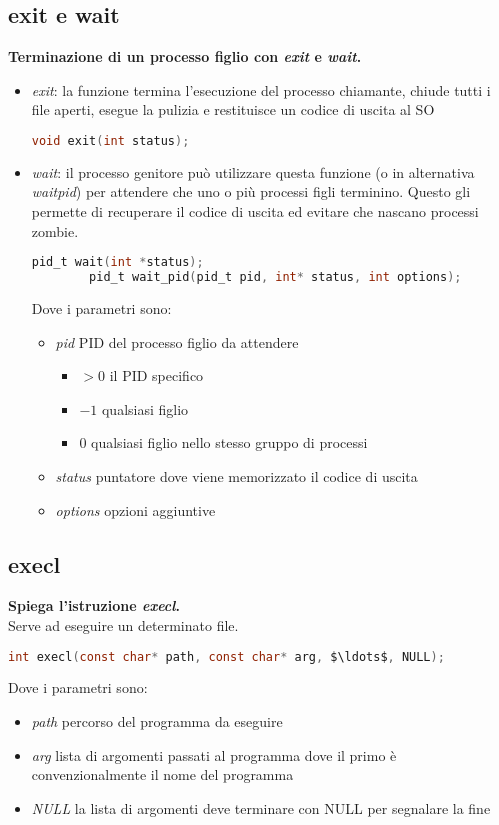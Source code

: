 \subsection{exit e wait}
\textbf{Terminazione di un processo figlio con \textit{exit} e \textit{wait}.}\\
\begin{itemize}
	\item \textit{exit}: la funzione termina l'esecuzione del processo chiamante, chiude tutti i file aperti, esegue la pulizia e restituisce un codice di uscita al SO
	\begin{lstlisting}[language=C]
		void exit(int status);
	\end{lstlisting}
	\item \textit{wait}: il processo genitore può utilizzare questa funzione (o in alternativa \textit{waitpid}) per attendere che uno o più processi figli terminino. Questo gli permette di recuperare il codice di uscita ed evitare che nascano processi zombie.
	\begin{lstlisting}[language=C]
		pid_t wait(int *status);
		pid_t wait_pid(pid_t pid, int* status, int options);
	\end{lstlisting}
	Dove i parametri sono:
	\begin{itemize}
		\item \textit{pid} PID del processo figlio da attendere
		\begin{itemize}
			\item $>0$ il PID specifico
			\item $-1$ qualsiasi figlio
			\item $0$ qualsiasi figlio nello stesso gruppo di processi
		\end{itemize}
		\item \textit{status} puntatore dove viene memorizzato il codice di uscita
		\item \textit{options} opzioni aggiuntive
	\end{itemize}
\end{itemize}
\subsection{execl}
\textbf{Spiega l'istruzione \textit{execl}.}\\
Serve ad eseguire un determinato file.
\begin{lstlisting}[language=C, mathescape]
	int execl(const char* path, const char* arg, $\ldots$, NULL);
\end{lstlisting}
Dove i parametri sono:
\begin{itemize}
	\item \textit{path} percorso del programma da eseguire
	\item \textit{arg} lista di argomenti passati al programma dove il primo è convenzionalmente il nome del programma
	\item \textit{NULL} la lista di argomenti deve terminare con NULL per segnalare la fine
\end{itemize}
\newpage
